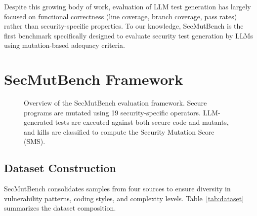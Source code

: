 \documentclass[sigconf,review,anonymous]{acmart}
\begin{document}
Despite this growing body of work, evaluation of LLM test generation has largely focused on functional correctness (line coverage, branch coverage, pass rates) rather than security-specific properties. To our knowledge, SecMutBench is the first benchmark specifically designed to evaluate security test generation by LLMs using mutation-based adequacy criteria.


\section{SecMutBench Framework}\label{sec:framework}

\begin{figure}[t]
  \centering
  \caption{Overview of the SecMutBench evaluation framework. Secure programs are mutated using 19 security-specific operators. LLM-generated tests are executed against both secure code and mutants, and kills are classified to compute the Security Mutation Score (SMS).}
  \label{fig:framework}
\end{figure}

\subsection{Dataset Construction}

SecMutBench consolidates samples from four sources to ensure diversity in vulnerability patterns, coding styles, and complexity levels. Table~\ref{tab:dataset} summarizes the dataset composition.
\end{document}
